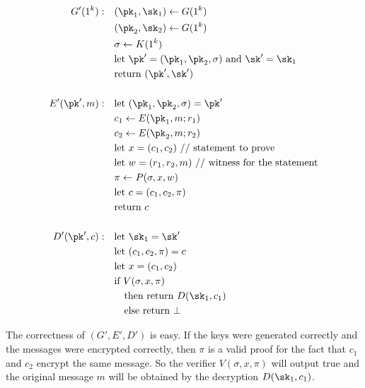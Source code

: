 \documentclass[12pt]{tufte-book}
\begin{document}
\begin{align*}
G'(1^k):\quad & (\pk_1,\sk_1) \leftarrow G(1^k) \\
              & (\pk_2,\sk_2) \leftarrow G(1^k) \\
              & \sigma \leftarrow K(1^k) \\
              & \text{let $\pk'=(\pk_1,\pk_2,\sigma)$ and $\sk'=\sk_1$} \\
              & \text{return $(\pk',\sk')$} \\
& \\
E'(\pk',m):\quad & \text{let $(\pk_1,\pk_2,\sigma)=\pk'$} \\
                 & c_1 \leftarrow E(\pk_1,m;r_1) \\
                 & c_2 \leftarrow E(\pk_2,m;r_2) \\
                 & \text{let $x=(c_1,c_2)$ // statement to prove} \\
                 & \text{let $w=(r_1,r_2,m)$ // witness for the statement} \\
                 & \pi \leftarrow P(\sigma,x,w) \\
                 & \text{let $c=(c_1,c_2,\pi)$} \\
                 & \text{return $c$} \\
& \\
D'(\pk',c):\quad & \text{let $\sk_1=\sk'$} \\
                 & \text{let $(c_1,c_2,\pi)=c$} \\
                 & \text{let $x=(c_1,c_2)$} \\
                 & \text{if $V(\sigma,x,\pi)$} \\
                 & \quad\text{then return $D(\sk_1,c_1)$} \\
                 & \quad\text{else return $\bot$} \\
\end{align*}

The correctness of $(G',E',D')$ is easy. If the keys were generated correctly and the
messages were encrypted correctly, then $\pi$ is a valid proof for the fact that
$c_1$ and $c_2$ encrypt the same message. So the verifier $V(\sigma,x,\pi)$ will
output true and the original message $m$ will be obtained by the decryption $D(\sk_1,c_1)$.
\end{document}
